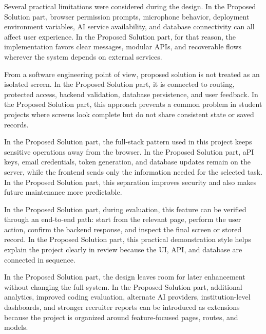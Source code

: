 \documentclass[12pt,a4paper]{report}
\begin{document}
Several practical limitations were considered during the design. In the Proposed Solution part, browser permission prompts, microphone behavior, deployment environment variables, AI service availability, and database connectivity can all affect user experience. In the Proposed Solution part, for that reason, the implementation favors clear messages, modular APIs, and recoverable flows wherever the system depends on external services.


From a software engineering point of view, proposed solution is not treated as an isolated screen. In the Proposed Solution part, it is connected to routing, protected access, backend validation, database persistence, and user feedback. In the Proposed Solution part, this approach prevents a common problem in student projects where screens look complete but do not share consistent state or saved records.


In the Proposed Solution part, the full-stack pattern used in this project keeps sensitive operations away from the browser. In the Proposed Solution part, aPI keys, email credentials, token generation, and database updates remain on the server, while the frontend sends only the information needed for the selected task. In the Proposed Solution part, this separation improves security and also makes future maintenance more predictable.


In the Proposed Solution part, during evaluation, this feature can be verified through an end-to-end path: start from the relevant page, perform the user action, confirm the backend response, and inspect the final screen or stored record. In the Proposed Solution part, this practical demonstration style helps explain the project clearly in review because the UI, API, and database are connected in sequence.


In the Proposed Solution part, the design leaves room for later enhancement without changing the full system. In the Proposed Solution part, additional analytics, improved coding evaluation, alternate AI providers, institution-level dashboards, and stronger recruiter reports can be introduced as extensions because the project is organized around feature-focused pages, routes, and models.
\end{document}
